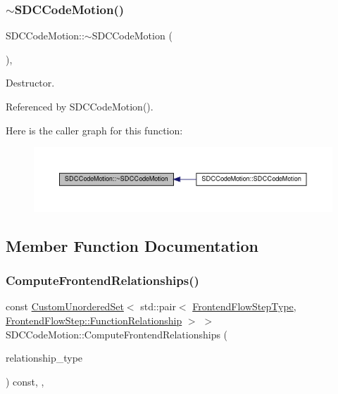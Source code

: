 \subsubsection{\texorpdfstring{$\sim$\+S\+D\+C\+Code\+Motion()}{~SDCCodeMotion()}}
{\footnotesize\ttfamily S\+D\+C\+Code\+Motion\+::$\sim$\+S\+D\+C\+Code\+Motion (\begin{DoxyParamCaption}{ }\end{DoxyParamCaption})\hspace{0.3cm}{\ttfamily [override]}, {\ttfamily [default]}}



Destructor. 



Referenced by S\+D\+C\+Code\+Motion().

Here is the caller graph for this function\+:
\nopagebreak
\begin{figure}[H]
\begin{center}
\leavevmode
\includegraphics[width=350pt]{d3/de8/classSDCCodeMotion_a2f00688119497ef05d3c48ce1f44e40a_icgraph}
\end{center}
\end{figure}


\subsection{Member Function Documentation}
\mbox{\label{classSDCCodeMotion_a98805e7900d0d802e0bda748ea581a79}} 
\subsubsection{\texorpdfstring{Compute\+Frontend\+Relationships()}{ComputeFrontendRelationships()}}
{\footnotesize\ttfamily const \hyperlink{classCustomUnorderedSet}{Custom\+Unordered\+Set}$<$ std\+::pair$<$ \hyperlink{frontend__flow__step_8hpp_afeb3716c693d2b2e4ed3e6d04c3b63bb}{Frontend\+Flow\+Step\+Type}, \hyperlink{classFrontendFlowStep_af7cf30f2023e5b99e637dc2058289ab0}{Frontend\+Flow\+Step\+::\+Function\+Relationship} $>$ $>$ S\+D\+C\+Code\+Motion\+::\+Compute\+Frontend\+Relationships (\begin{DoxyParamCaption}\item[{const \hyperlink{classDesignFlowStep_a723a3baf19ff2ceb77bc13e099d0b1b7}{Design\+Flow\+Step\+::\+Relationship\+Type}}]{relationship\+\_\+type }\end{DoxyParamCaption}) const\hspace{0.3cm}{\ttfamily [override]}, {\ttfamily [private]}, {\ttfamily [virtual]}}



